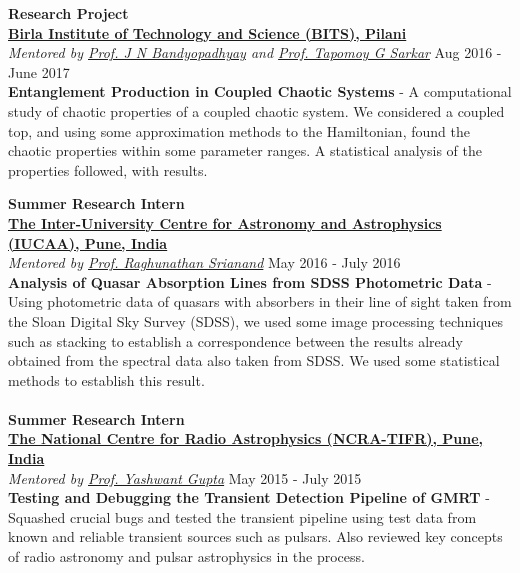 \documentclass[margin, centered]{res}
\begin{document}
\begin{resume}
\textbf{Research Project}\\
\textbf{\href{http://www.bits-pilani.ac.in/}{Birla Institute of Technology and Science (BITS), Pilani}}\\
\emph{Mentored by \href{http://www.bits-pilani.ac.in/Pilani/jayendra/Profile}{Prof. J N Bandyopadhyay} and \href{http://www.bits-pilani.ac.in/Pilani/tapomoy/Profile}{Prof. Tapomoy G Sarkar}} \hfill Aug 2016 - June 2017\\
\textbf{Entanglement Production in Coupled Chaotic Systems} - A computational study of chaotic properties of a coupled chaotic system. We considered a coupled top, and using some approximation methods to the Hamiltonian, found the chaotic properties within some parameter ranges. A statistical analysis of the properties followed, with results.

\textbf{Summer Research Intern}
\\
\textbf{\href{http://www.iucaa.ernet.in/}{The Inter-University Centre for Astronomy and Astrophysics (IUCAA), Pune, India}}
\\
\emph{Mentored by \href{http://www.iucaa.ernet.in/~anand/}{Prof. Raghunathan Srianand}} \hfill May 2016 - July 2016\\
\textbf{Analysis of Quasar Absorption Lines from SDSS Photometric Data} - Using photometric data of quasars with absorbers in their line of sight taken from the Sloan Digital Sky Survey (SDSS), we used some image processing techniques such as stacking to establish a correspondence between the results already obtained from the spectral data also taken from SDSS. We used some statistical methods to establish this result. \\
\\
\textbf{Summer Research Intern}\\
\textbf{\href{http://www.ncra.tifr.res.in/}{The National Centre for Radio Astrophysics (NCRA-TIFR), Pune, India}}\\
\emph{Mentored by \href{http://www.ncra.tifr.res.in/ncra/people/academic/ncra-faculty/Yashwant_Gupta}{Prof. Yashwant Gupta}} \hfill May 2015 - July 2015\\
\textbf{Testing and Debugging the Transient Detection Pipeline of GMRT} - Squashed crucial bugs and tested the transient pipeline using test data from known and reliable transient sources such as pulsars. Also reviewed key concepts of radio astronomy and pulsar astrophysics in the process.




\end{resume}
\end{document}
